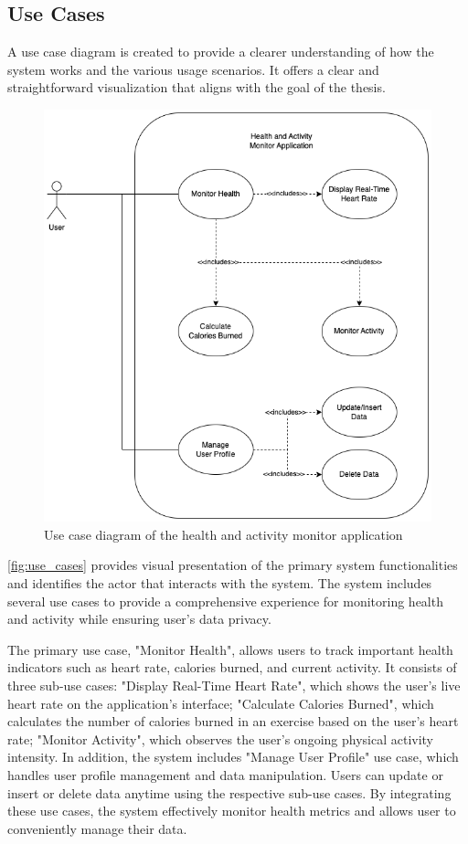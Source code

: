 \subsection{Use Cases}
\label{chap:use_case}
A use case diagram is created to provide a clearer understanding of how the system works and the various usage scenarios. It offers a clear and straightforward visualization that aligns with the goal of the thesis.
\begin{figure}[H]
    \centering
    \includegraphics[width=1\textwidth]{diagrams/usecase.drawio.png}
    \caption{Use case diagram of the health and activity monitor application}
    \label{fig:use_cases}
\end{figure}
\newpage
\autoref{fig:use_cases} provides visual presentation of the primary system functionalities and identifies the actor that interacts with the system.
The system includes several use cases to provide a comprehensive experience for monitoring health and activity while ensuring user's data privacy.

The primary use case, "Monitor Health", allows users to track important health indicators such as heart rate, calories burned, and current activity. It consists of three sub-use cases: "Display Real-Time Heart Rate", which shows the user's live heart rate on the application's interface; "Calculate Calories Burned", which calculates the number of calories burned in an exercise based on the user's heart rate;  "Monitor Activity", which observes the user's ongoing physical activity intensity. In addition, the system includes "Manage User Profile" use case, which handles user profile management and data manipulation. Users can update or insert or delete data anytime using the respective sub-use cases. By integrating these use cases, the system effectively monitor health metrics and allows user to conveniently manage their data.

